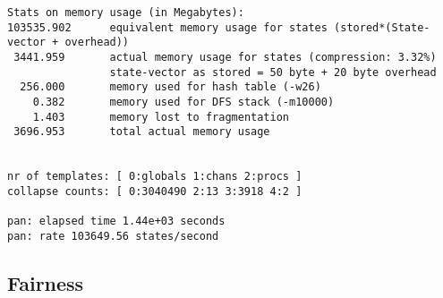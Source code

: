 \documentclass{llncs}
\begin{document}
\begin{lstlisting}
Stats on memory usage (in Megabytes):
103535.902      equivalent memory usage for states (stored*(State-vector + overhead))
 3441.959       actual memory usage for states (compression: 3.32%)
                state-vector as stored = 50 byte + 20 byte overhead
  256.000       memory used for hash table (-w26)
    0.382       memory used for DFS stack (-m10000)
    1.403       memory lost to fragmentation
 3696.953       total actual memory usage


nr of templates: [ 0:globals 1:chans 2:procs ]
collapse counts: [ 0:3040490 2:13 3:3918 4:2 ]

pan: elapsed time 1.44e+03 seconds
pan: rate 103649.56 states/second
\end{lstlisting}

\subsection{Fairness}
\label{mc:app:unb:fai}

\begin{lstlisting}

\end{lstlisting}
\end{document}
